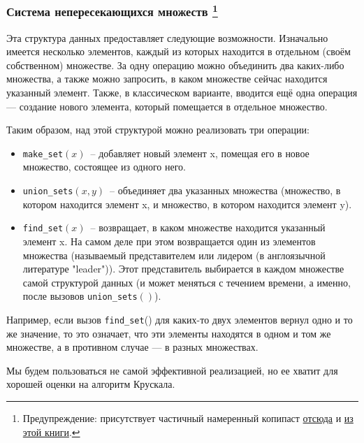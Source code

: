 \subsubsection[Система неперескающихся множеств]{
    Система непересекающихся множеств
    \protect\footnote{
        Предупреждение: присутствует частичный намеренный копипаст \href{https://e-maxx.ru/algo/dsu}{отсюда} и \href{https://biblio.mccme.ru/node/5623}{из этой книги}.
    }
}

Эта структура данных предоставляет следующие возможности. Изначально имеется несколько элементов, каждый из которых находится в отдельном (своём собственном) множестве. За одну операцию можно объединить два каких-либо множества, а также можно запросить, в каком множестве сейчас находится указанный элемент. Также, в классическом варианте, вводится ещё одна операция — создание нового элемента, который помещается в отдельное множество.

Таким образом, над этой структурой можно реализовать три операции:

\begin{itemize}
	\item {\tt make\_set}$(x)$~-- добавляет новый элемент x, помещая его в новое множество, состоящее из одного него.
	\item {\tt union\_sets}$(x,y)$~-- объединяет два указанных множества (множество, в котором находится элемент x, и множество, в котором находится элемент y).
	\item {\tt find\_set}$(x)$~-- возвращает, в каком множестве находится указанный элемент x. На самом деле при этом возвращается один из элементов множества (называемый представителем или лидером (в англоязычной литературе "leader")). Этот представитель выбирается в каждом множестве самой структурой данных (и может меняться с течением времени, а именно, после вызовов {\tt union\_sets}$()$).
\end{itemize}

Например, если вызов {\tt find\_set}() для каких-то двух элементов вернул одно и то же значение, то это означает, что эти элементы находятся в одном и том же множестве, а в противном случае — в разных множествах.

Мы будем пользоваться не самой эффективной реализацией, но ее хватит для хорошей оценки на алгоритм Крускала.

